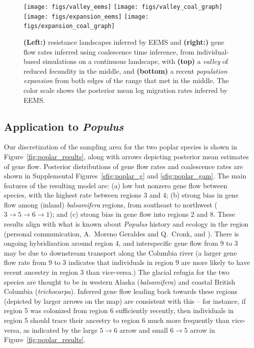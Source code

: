 \documentclass{article}
\begin{document}
\begin{figure}
\centering
    \texttt{[image: figs/valley\_eems]}
    \texttt{[image: figs/valley\_coal\_graph]}
    \texttt{[image: figs/expansion\_eems]}
    \texttt{[image: figs/expansion\_coal\_graph]}
    \caption{
        \textbf{(Left:)}
        resistance landscapes inferred by EEMS
        and 
        \textbf{(right:)}
        gene flow rates inferred using coalescence time inference,
        from individual-based simulations on a continuous landscape,
        with \textbf{(top)} a \emph{valley} of reduced fecundity in the middle, and
        \textbf{(bottom)} a recent \emph{population expansion} from both edges of the range
        that met in the middle.
        The color scale shows the posterior mean log migration rates inferred by EEMS.
        \label{fig:more_barriers}
    }
\end{figure}

\subsection*{Application to \textit{Populus}}

Our discretization of the sampling area for the two poplar species
is shown in Figure~\ref{fig:poplar_results},
along with arrows depicting posterior mean estimates of gene flow.
Posterior distributions of gene flow rates and coalescence rates
are shown in Supplemental Figures~\ref{sfig:poplar_g} and \ref{sfig:poplar_gam}.
The main features of the resulting model are:
(a) low but nonzero gene flow between species,
with the highest rate between regions 3 and 4;
(b) strong bias in gene flow among (inland) \textit{balsamifera} regions,
from southeast to northwest ($3 \to 5 \to 6 \to 1$); and 
(c) strong bias in gene flow into regions 2 and 8.
These results align with what is known about \textit{Populus} history and ecology in the region
(personal communication, A.~Moreno Geraldes and Q.~Cronk, and \citet{geraldes2014landscape}).
There is ongoing hybridization around region 4,
and interspecific gene flow from 9 to 3 may be due to downstream transport along the Columbia river
(a larger gene flow rate from 9 to 3 indicates that individuals in region 9
are more likely to have recent ancestry in region 3 than vice-versa.)
The glacial refugia for the two species are thought to be in western Alaska (\textit{balsamifera})
and coastal British Columbia (\textit{trichocarpa}).
Inferred gene flow leading back towards these regions (depicted by larger arrows on the map)
are consistent with this --
for instance, if region 5 was colonized from region 6 sufficiently recently,
then individuals in region 5 should trace their ancestry to region 6 much more frequently
than vice-versa, as indicated by the large $5 \to 6$ arrow 
and small $6 \to 5$ arrow in Figure~\ref{fig:poplar_results}.
\end{document}
